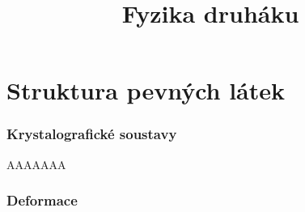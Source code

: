 \documentclass{article}
\title{\vspace{-2cm}Fyzika druháku\vspace{-1.7cm}}
\date{}
\author{}
\begin{document}
\maketitle

\part{Struktura pevných látek}

\section{Krystalografické soustavy}
AAAAAAA

\section{Deformace}
\end{document}
